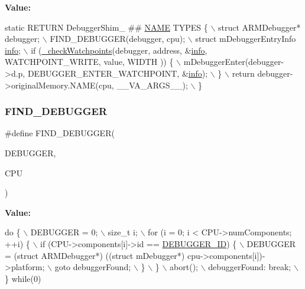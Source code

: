 {\bfseries Value\+:}
\begin{DoxyCode}
\textcolor{keyword}{static} RETURN DebuggerShim\_ ## \mbox{\hyperlink{inflate_8h_a164ea0159d5f0b5f12a646f25f99eceaa67bc2ced260a8e43805d2480a785d312}{NAME}} TYPES \{ \(\backslash\)
        struct ARMDebugger* debugger; \(\backslash\)
        FIND\_DEBUGGER(debugger, cpu); \(\backslash\)
        struct mDebuggerEntryInfo \mbox{\hyperlink{libretro_8h_a283ad41e4809f9c0ebe736a9861d8a91}{info}}; \(\backslash\)
        if (\mbox{\hyperlink{arm_2debugger_2memory-debugger_8c_af27e1b9541b0d441825fffdc4d3ad7fb}{\_checkWatchpoints}}(debugger, address, &\mbox{\hyperlink{libretro_8h_structretro__game__info}{info}}, WATCHPOINT\_WRITE, value, WIDTH
      )) \{ \(\backslash\)
            mDebuggerEnter(debugger->d.p, DEBUGGER\_ENTER\_WATCHPOINT, &\mbox{\hyperlink{libretro_8h_structretro__game__info}{info}}); \(\backslash\)
        \} \(\backslash\)
        return debugger->originalMemory.NAME(cpu, \_\_VA\_ARGS\_\_); \(\backslash\)
    \}
\end{DoxyCode}
\mbox{\label{arm_2debugger_2memory-debugger_8c_ac0a015bae6add1406e70a94743727d6d}} 
\subsubsection{\texorpdfstring{F\+I\+N\+D\+\_\+\+D\+E\+B\+U\+G\+G\+ER}{FIND\_DEBUGGER}}
{\footnotesize\ttfamily \#define F\+I\+N\+D\+\_\+\+D\+E\+B\+U\+G\+G\+ER(\begin{DoxyParamCaption}\item[{}]{D\+E\+B\+U\+G\+G\+ER,  }\item[{}]{C\+PU }\end{DoxyParamCaption})}

{\bfseries Value\+:}
\begin{DoxyCode}
\textcolor{keywordflow}{do} \{ \(\backslash\)
        DEBUGGER = 0; \(\backslash\)
        size\_t i; \(\backslash\)
        for (i = 0; i < CPU->numComponents; ++i) \{ \(\backslash\)
            if (CPU->components[i]->id == \mbox{\hyperlink{debugger_2debugger_8c_ae33c11549450a32642dcb0452471a22a}{DEBUGGER\_ID}}) \{ \(\backslash\)
                DEBUGGER = (\textcolor{keyword}{struct }ARMDebugger*) ((\textcolor{keyword}{struct} mDebugger*) cpu->components[i])->platform; \(\backslash\)
                goto debuggerFound; \(\backslash\)
            \} \(\backslash\)
        \} \(\backslash\)
        abort(); \(\backslash\)
        debuggerFound: \textcolor{keywordflow}{break}; \(\backslash\)
    \} \textcolor{keywordflow}{while}(0)
\end{DoxyCode}


